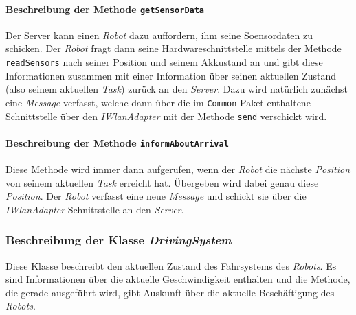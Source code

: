 			\paragraph{Beschreibung der Methode \texttt{getSensorData}}
			Der Server kann einen \textit{Robot} dazu auffordern, ihm seine Soensordaten zu schicken. Der \textit{Robot} fragt dann seine Hardwareschnittstelle mittels der Methode \texttt{readSensors} 
			nach seiner Position und seinem Akkustand an und gibt diese Informationen zusammen mit einer Information über seinen aktuellen Zustand (also seinem aktuellen \textit{Task}) zurück an den \textit{Server}. Dazu wird natürlich zunächst eine \textit{Message} verfasst, welche dann über die im \texttt{Common}-Paket enthaltene Schnittstelle über den \textit{IWlanAdapter} mit der Methode \texttt{send} verschickt wird.
			
			\paragraph{Beschreibung der Methode \texttt{informAboutArrival}}
			Diese Methode wird immer dann aufgerufen, wenn der \textit{Robot} die nächste \textit{Position} von seinem aktuellen \textit{Task} erreicht hat. Übergeben wird dabei genau diese \textit{Position}. Der \textit{Robot} verfasst eine neue \textit{Message} und schickt sie über die \textit{IWlanAdapter}-Schnittstelle an den \textit{Server}. 
			
	\subsubsection{Beschreibung der Klasse \textit{DrivingSystem}}
		
		Diese Klasse beschreibt den aktuellen Zustand des Fahrsystems des \textit{Robots}. 
		Es sind Informationen über die aktuelle Geschwindigkeit enthalten und die Methode, 
		die gerade ausgeführt wird, gibt Auskunft über die aktuelle Beschäftigung des \textit{Robots}.

